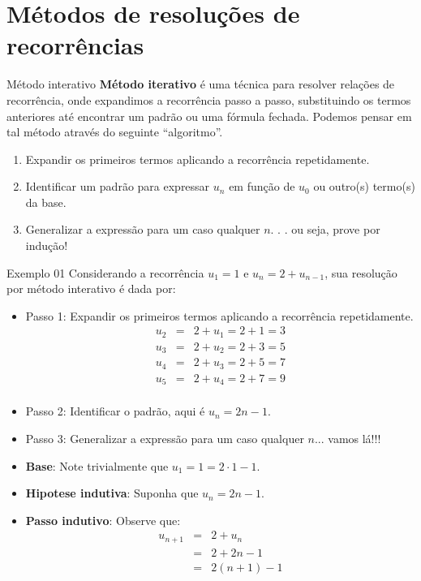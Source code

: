 \section{Métodos de resoluções de recorrências}

\begin{frame}{Método interativo}
  \textbf{Método iterativo} é uma técnica para resolver relações de recorrência, onde expandimos a recorrência passo a passo, substituindo os termos anteriores até encontrar um padrão ou uma fórmula fechada. Podemos pensar em tal método através do seguinte ``algoritmo''.
  \begin{enumerate}
    \item Expandir os primeiros termos aplicando a recorrência repetidamente.
    \item Identificar um padrão para expressar $u_n$ em função de $u_0$ ou outro(s) termo(s) da base.
    \item Generalizar a expressão para um caso qualquer $n$. . . ou seja, prove por indução!
  \end{enumerate}
\end{frame}

\begin{frame}{Exemplo 01}
  Considerando a recorrência $u_1 = 1$ e $u_{n} = 2 + u_{n - 1}$, sua resolução por método interativo é dada por:
  \begin{itemize}
    \pause
    \item Passo 1: Expandir os primeiros termos aplicando a recorrência repetidamente.
    \begin{eqnarray*}
      u_{2} & = & 2 + u_1 = 2 + 1 = 3\\
      u_{3} & = & 2 + u_2 = 2 + 3 = 5\\
      u_{4} & = & 2 + u_3 = 2 + 5 = 7\\
      u_{5} & = & 2 + u_4 = 2 + 7 = 9\\
    \end{eqnarray*}
    \item Passo 2: Identificar o padrão, aqui é $u_n = 2n - 1$.
    \item Passo 3: Generalizar a expressão para um caso qualquer $n$... vamos lá!!!
  \end{itemize}
\end{frame}

\begin{frame}
  \begin{itemize}
    \item \textbf{Base}:  Note trivialmente que $u_1 = 1 = 2\cdot 1 - 1$.
    \item \textbf{Hipotese indutiva}:  Suponha que $u_n = 2n - 1$.
    \item \textbf{Passo indutivo}: Observe que:
    \begin{eqnarray*}
      u_{n+1} & = & 2 + u_{n}\\
      & = & 2 + 2n - 1\\
      & = & 2(n + 1) - 1
    \end{eqnarray*}
  \end{itemize}
\end{frame}

